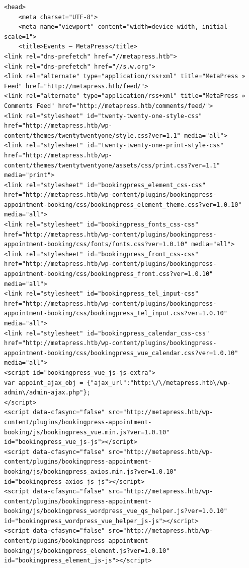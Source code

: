 \documentclass[11pt]{article}
\begin{document}
\begin{enumerate}
\begin{enumerate}
\begin{verbatim}
<head>
	<meta charset="UTF-8">
	<meta name="viewport" content="width=device-width, initial-scale=1">
	<title>Events – MetaPress</title>
<link rel="dns-prefetch" href="//metapress.htb">
<link rel="dns-prefetch" href="//s.w.org">
<link rel="alternate" type="application/rss+xml" title="MetaPress » Feed" href="http://metapress.htb/feed/">
<link rel="alternate" type="application/rss+xml" title="MetaPress » Comments Feed" href="http://metapress.htb/comments/feed/">
<link rel="stylesheet" id="twenty-twenty-one-style-css" href="http://metapress.htb/wp-content/themes/twentytwentyone/style.css?ver=1.1" media="all">
<link rel="stylesheet" id="twenty-twenty-one-print-style-css" href="http://metapress.htb/wp-content/themes/twentytwentyone/assets/css/print.css?ver=1.1" media="print">
<link rel="stylesheet" id="bookingpress_element_css-css" href="http://metapress.htb/wp-content/plugins/bookingpress-appointment-booking/css/bookingpress_element_theme.css?ver=1.0.10" media="all">
<link rel="stylesheet" id="bookingpress_fonts_css-css" href="http://metapress.htb/wp-content/plugins/bookingpress-appointment-booking/css/fonts/fonts.css?ver=1.0.10" media="all">
<link rel="stylesheet" id="bookingpress_front_css-css" href="http://metapress.htb/wp-content/plugins/bookingpress-appointment-booking/css/bookingpress_front.css?ver=1.0.10" media="all">
<link rel="stylesheet" id="bookingpress_tel_input-css" href="http://metapress.htb/wp-content/plugins/bookingpress-appointment-booking/css/bookingpress_tel_input.css?ver=1.0.10" media="all">
<link rel="stylesheet" id="bookingpress_calendar_css-css" href="http://metapress.htb/wp-content/plugins/bookingpress-appointment-booking/css/bookingpress_vue_calendar.css?ver=1.0.10" media="all">
<script id="bookingpress_vue_js-js-extra">
var appoint_ajax_obj = {"ajax_url":"http:\/\/metapress.htb\/wp-admin\/admin-ajax.php"};
</script>
<script data-cfasync="false" src="http://metapress.htb/wp-content/plugins/bookingpress-appointment-booking/js/bookingpress_vue.min.js?ver=1.0.10" id="bookingpress_vue_js-js"></script>
<script data-cfasync="false" src="http://metapress.htb/wp-content/plugins/bookingpress-appointment-booking/js/bookingpress_axios.min.js?ver=1.0.10" id="bookingpress_axios_js-js"></script>
<script data-cfasync="false" src="http://metapress.htb/wp-content/plugins/bookingpress-appointment-booking/js/bookingpress_wordpress_vue_qs_helper.js?ver=1.0.10" id="bookingpress_wordpress_vue_helper_js-js"></script>
<script data-cfasync="false" src="http://metapress.htb/wp-content/plugins/bookingpress-appointment-booking/js/bookingpress_element.js?ver=1.0.10" id="bookingpress_element_js-js"></script>

\end{verbatim}
\end{enumerate}
\end{enumerate}
\end{document}
